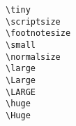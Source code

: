 \documentclass{scrartcl}
\begin{document}
	\begin{preview}
		\centering 
			\tiny \verb+\tiny+\\
			\scriptsize \verb+\scriptsize+\\
			\footnotesize \verb+\footnotesize+\\
			\small \verb+\small+\\
			\normalsize \verb+\normalsize+\\
			\large \verb+\large+\\
			\Large \verb+\Large+\\
			\LARGE \verb+\LARGE+\\
			\huge \verb+\huge+\\
			\Huge \verb+\Huge+\\
	\end{preview}
\end{document}
